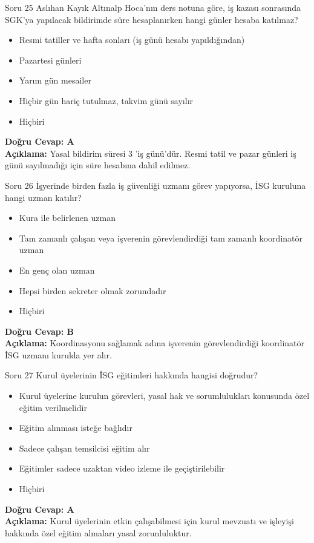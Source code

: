 \documentclass[12pt,a4paper]{article}
\begin{document}
\begin{testcard}{Soru 25}
    Aslıhan Kayık Altınalp Hoca'nın ders notuna göre, iş kazası sonrasında SGK'ya yapılacak bildirimde süre hesaplanırken hangi günler hesaba katılmaz?
    \begin{itemize}
        \item[A)] Resmi tatiller ve hafta sonları (iş günü hesabı yapıldığından)
        \item[B)] Pazartesi günleri
        \item[C)] Yarım gün mesailer
        \item[D)] Hiçbir gün hariç tutulmaz, takvim günü sayılır
        \item[E)] Hiçbiri
    \end{itemize}
    \tcblower
    \textbf{Doğru Cevap: A} \\
    \textbf{Açıklama:} Yasal bildirim süresi 3 'iş günü'dür. Resmi tatil ve pazar günleri iş günü sayılmadığı için süre hesabına dahil edilmez.
\end{testcard}

\begin{testcard}{Soru 26}
    İşyerinde birden fazla iş güvenliği uzmanı görev yapıyorsa, İSG kuruluna hangi uzman katılır?
    \begin{itemize}
        \item[A)] Kura ile belirlenen uzman
        \item[B)] Tam zamanlı çalışan veya işverenin görevlendirdiği tam zamanlı koordinatör uzman
        \item[C)] En genç olan uzman
        \item[D)] Hepsi birden sekreter olmak zorundadır
        \item[E)] Hiçbiri
    \end{itemize}
    \tcblower
    \textbf{Doğru Cevap: B} \\
    \textbf{Açıklama:} Koordinasyonu sağlamak adına işverenin görevlendirdiği koordinatör İSG uzmanı kurulda yer alır.
\end{testcard}

\begin{testcard}{Soru 27}
    Kurul üyelerinin İSG eğitimleri hakkında hangisi doğrudur?
    \begin{itemize}
        \item[A)] Kurul üyelerine kurulun görevleri, yasal hak ve sorumlulukları konusunda özel eğitim verilmelidir
        \item[B)] Eğitim alınması isteğe bağlıdır
        \item[C)] Sadece çalışan temsilcisi eğitim alır
        \item[D)] Eğitimler sadece uzaktan video izleme ile geçiştirilebilir
        \item[E)] Hiçbiri
    \end{itemize}
    \tcblower
    \textbf{Doğru Cevap: A} \\
    \textbf{Açıklama:} Kurul üyelerinin etkin çalışabilmesi için kurul mevzuatı ve işleyişi hakkında özel eğitim almaları yasal zorunluluktur.
\end{testcard}
\end{document}
